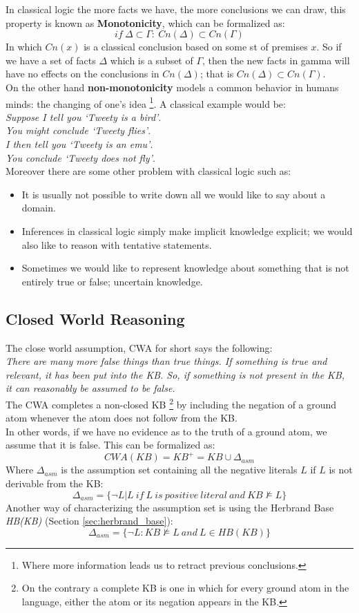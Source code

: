 \documentclass[10pt,a4paper]{article}
\begin{document}
In classical logic the more facts we have, the more conclusions we can draw, this property is known as \textbf{Monotonicity}, which can be formalized as:
\[if\ \Delta \subset \Gamma:\ Cn(\Delta)\subset Cn(\Gamma)\]
In which $Cn(x)$ is a classical conclusion based on some st of premises $x$. So if we have a set of facts $\Delta$ which is a subset of $\Gamma$, then the new facts in gamma will have no effects on the conclusions in $Cn(\Delta)$; that is $  Cn(\Delta)\subset Cn(\Gamma)$.\\
On the other hand \textbf{non-monotonicity} models a common behavior in humans minds: the changing of one's idea \footnote{Where more information leads us to retract previous conclusions.}. A classical example would be:\\ 
\textit{Suppose I tell you ‘Tweety is a bird’}.\\
\textit{You might conclude ‘Tweety flies’}.\\
\textit{I then tell you ‘Tweety is an emu’}.\\
\textit{You conclude ‘Tweety does not fly’}.\\

Moreover there are some other problem with classical logic such as:
\begin{itemize}
\item It is usually not possible to write down all we would like to say about a domain.
\item  Inferences in classical logic simply make implicit knowledge explicit; we would also like to reason with tentative statements.
\item Sometimes we would like to represent knowledge about something that is not entirely true or false; uncertain knowledge.
\end{itemize}

\subsection{Closed World Reasoning}
The close world assumption, CWA for short says the following:\\
\textit{There are many more false things than true things. If something is true and relevant, it has been put into the KB. So, if something is not present in the KB, it can reasonably be assumed to be false.}\\
The CWA completes a non-closed KB \footnote{On the contrary a complete KB is one in which for every ground atom in the language, either the atom or its negation appears in the KB. } by including the negation of a ground atom whenever the atom does not follow from the KB.\\
In other words, if we have no evidence as to the truth of a ground atom, we assume that it is false. This can be formalized as:
\[CWA(KB)=KB^+=KB \cup \Delta_{asm}\]
Where $\Delta_{asm}$ is the assumption set containing all the negative literals $L$ if $L$ is not derivable from the KB:
\[\Delta_{asm}=\{\neg L | L\ if\ L\ is\ positive\ literal\ and\ KB \nvDash L\}\]
Another way of characterizing the assumption set is using the Herbrand Base \textit{HB(KB)} (Section \ref{sec:herbrand_base}):
\[\Delta_{asm}=\{\neg L : KB \nvDash L\ and\ L\in HB(KB)\}\]
\end{document}
